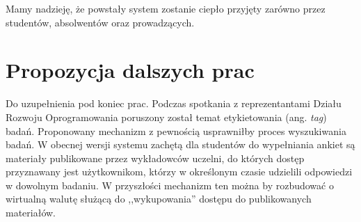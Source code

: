 Mamy nadzieję, że powstały system zostanie ciepło przyjęty zarówno przez studentów, absolwentów oraz prowadzących.\\

\section{Propozycja dalszych prac}
\label{Chapter92}

{\color{red}Do uzupełnienia pod koniec prac.}
Podczas spotkania z reprezentantami Działu Rozwoju Oprogramowania poruszony został temat etykietowania (ang. \emph{tag}) badań. Proponowany mechanizm z pewnością usprawniłby proces wyszukiwania badań. W obecnej wersji systemu zachętą dla studentów do wypełniania ankiet są materiały publikowane przez wykładowców uczelni, do których dostęp przyznawany jest użytkownikom, którzy w określonym czasie udzielili odpowiedzi w dowolnym badaniu. W przyszłości mechanizm ten można by rozbudować o wirtualną walutę służącą do ,,wykupowania'' dostępu do publikowanych materiałów.